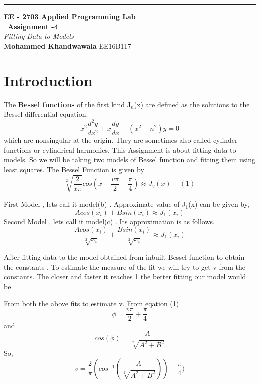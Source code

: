 \documentclass[a4paper]{article}
\begin{document}
\begin{titlepage}
	\raggedleft
	\rule{1pt}{\textheight} 
	\hspace{0.05\textwidth} 
	\parbox[b]{0.75\textwidth}{		
		{\LARGE\bfseries EE - 2703 Applied Programming Lab \\[0.5\baselineskip]  ~\huge Assignment -4}\\[2\baselineskip] 
		{\large\textit{Fitting Data to Models}}\\[4\baselineskip] 
		{\Large\textbf{Mohammed Khandwawala}}
        \large EE16B117
		\vspace{0.5\textheight}  
	}

\end{titlepage}


\tableofcontents


\section{Introduction}



The \textbf{Bessel functions} of the first kind J$_{n}$(x) are defined as the solutions to the Bessel differential equation.
$$x^{2}\frac{d^2{y}}{dx^{2}}+x\frac{dy}{dx}+(x^{2}-n^{2})y = 0 	$$
which are nonsingular at the origin. They are sometimes also called cylinder functions or cylindrical harmonics. This Assignment is about fitting data to models. So we will be taking two models of Bessel function and fitting them using least squares. 
The Bessel Function is given by
$$ \sqrt[2]{\frac{2}{x\pi}}cos(x-\frac{v\pi}{2}-\frac{\pi}{4}) \approx J_{v}(x)		-(1)$$ 

First Model , lets call it model(b) . Approximate value of J$_{1}$(x) can be given by,
	$$ Acos(x_{i}) + Bsin(x_{i}) \approx J_{1}(x_{i})$$
Second Model , lets call it model(c) . Its approximation is as follows.
	$$ \frac{Acos(x_{i})}{\sqrt[2]{x_{i}}} + \frac{Bsin(x_{i})}{\sqrt[2]{x_{i}}} \approx J_{1}(x_{i})$$

After fitting data to the model obtained from inbuilt Bessel function to obtain the constants . To estimate the measure of the fit we will try to get v from the constants. The closer and faster it reaches 1 the better fitting our model would be.

	From both the above fits to estimate v. From eqation (1) $$\phi = \frac{v\pi}{2}+\frac{\pi}{4}$$
    and $$cos(\phi) = \frac{A}{\sqrt[2]{A^{2}+B^{2}}}$$
So, 
$$ v = \frac{2}{\pi}(cos^{-1}(\frac{A}{\sqrt[2]{A^{2}+B^{2}}}))-\frac{\pi}{4})$$
\end{document}
